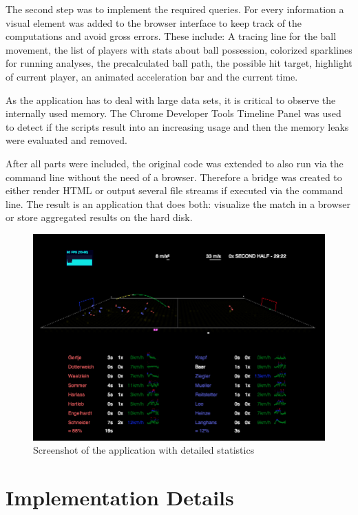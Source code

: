 \documentclass{sig-alternate}
\begin{document}
The second step was to implement the required queries.
For every information a visual element was added
to the browser interface to keep track of the computations
and avoid gross errors.
These include: A tracing line for the ball movement,
the list of players with stats about ball possession,
colorized sparklines for running analyses,
the precalculated ball path, the possible hit target,
highlight of current player, an animated acceleration bar
and the current time.

As the application has to deal with large data sets,
it is critical to observe the internally used memory.
The Chrome Developer Tools Timeline Panel was used
to detect if the scripts result into an increasing usage
and then the memory leaks were evaluated and removed.

After all parts were included, the original code
was extended to also run via the command line
without the need of a browser.
Therefore a bridge was created to either render HTML
or output several file streams if executed via the command line.
The result is an application that does both:
visualize the match in a browser or store aggregated results
on the hard disk.

\begin{figure}[t!]
  \centering
  \includegraphics[width=\linewidth]{soccer.png}
  \caption{Screenshot of the application with detailed statistics}
  \label{fig:screenshot}
\end{figure}

\section{Implementation Details}
\label{sec:implementation-details}
\end{document}
